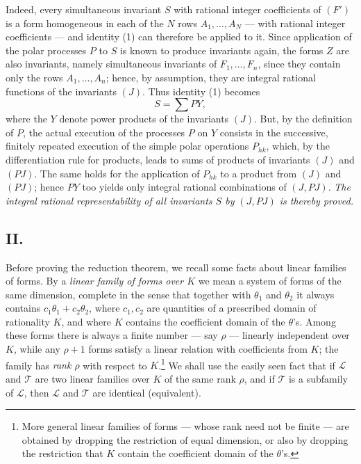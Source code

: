 Indeed, every simultaneous invariant $S$ with rational integer coefficients of $(F')$ is a form homogeneous in each of the $N$ rows $A_1,
\ldots,A_N$ --- with rational integer coefficients --- and identity (1) can therefore be applied to it. Since application of the polar processes $P$ to $S$ is known to produce invariants again, the forms $Z$ are also invariants, namely simultaneous invariants of $F_1,
\ldots,F_n$, since they contain only the rows $A_1,
\ldots,A_n$; hence, by assumption, they are integral rational functions of the invariants $(J)$. Thus identity (1) becomes
\[
  S=\sum PY,
\]
where the $Y$ denote power products of the invariants $(J)$. But, by the definition of $P$, the actual execution of the processes $P$ on $Y$ consists in the successive, finitely repeated execution of the simple polar operations $P_{hk}$, which, by the differentiation rule for products, leads to sums of products of invariants $(J)$ and $(PJ)$. The same holds for the application of $P_{hk}$ to a product from $(J)$ and $(PJ)$; hence $PY$ too yields only integral rational combinations of $(J,PJ)$. \emph{The integral rational representability of all invariants $S$ by $(J,PJ)$ is thereby proved.}

\subsection*{II.}
Before proving the reduction theorem, we recall some facts about linear families of forms. By a \emph{linear family of forms over $K$} we mean a system of forms of the same dimension, complete in the sense that together with $\theta_1$ and $\theta_2$ it always contains $c_1\theta_1+c_2\theta_2$, where $c_1,c_2$ are quantities of a prescribed domain of rationality $K$, and where $K$ contains the coefficient domain of the $\theta$'s. Among these forms there is always a finite number --- say $\rho$ --- linearly independent over $K$, while any $\rho+1$ forms satisfy a linear relation with coefficients from $K$; the family has \emph{rank $\rho$} with respect to $K$.\footnote{More general linear families of forms --- whose rank need not be finite --- are obtained by dropping the restriction of equal dimension, or also by dropping the restriction that $K$ contain the coefficient domain of the $\theta$'s.} We shall use the easily seen fact that if $\mathcal L$ and $\mathcal T$ are two linear families over $K$ of the same rank $\rho$, and if $\mathcal T$ is a subfamily of $\mathcal L$, then $\mathcal L$ and $\mathcal T$ are identical (equivalent).

